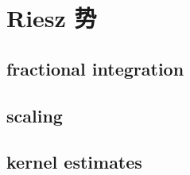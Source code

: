 \section{Riesz 势}
\label{b2:sec:1901}


\subsection{fractional integration}
\label{b2:subsec:190101}

\subsection{scaling}
\label{b2:subsec:190102}

\subsection{kernel estimates}
\label{b2:subsec:190103}


